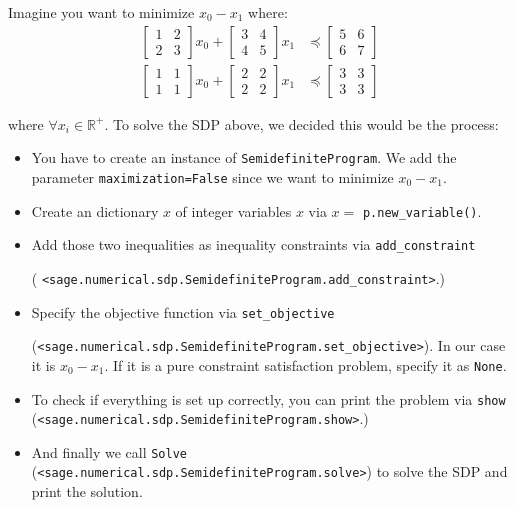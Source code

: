 Imagine you want to minimize $x_0 - x_1$ where:
\begin{align}
\left[\begin{matrix} 1 & 2  \\ 2 & 3  \end{matrix}\right]  x_0 +  \left[\begin{matrix} 3 & 4  \\ 4 & 5  \end{matrix}\right]  x_1 &\preceq   \left[\begin{matrix} 5 & 6  \\ 6 & 7  \end{matrix}\right] \\ 
\left[\begin{matrix} 1 & 1  \\ 1 & 1  \end{matrix}\right]  x_0 +  \left[ \begin{matrix} 2 & 2  \\ 2 & 2  \end{matrix}\right]  x_1 &\preceq   \left[\begin{matrix} 3 & 3  \\ 3 & 3  \end{matrix}\right] 
\end{align}


where $\forall x_i \in \mathbb{R}^+$.  To solve the SDP above, we decided this would be the process:

\begin{itemize}
  \item You have to create an instance of \texttt{SemidefiniteProgram}. We
     add the parameter \texttt{maximization=False} since we want to minimize $x_0 - x_1$.

  \item Create an dictionary $x$ of integer variables $x$ via $x =$
  \texttt{p.new\_variable()}.
  \item Add those two inequalities as inequality constraints via
     \texttt{add\_constraint} 
     
     ( \texttt{<sage.numerical.sdp.SemidefiniteProgram.add\_constraint>}.)

  \item Specify the objective function via \texttt{set\_objective}
  
   (\texttt{<sage.numerical.sdp.SemidefiniteProgram.set\_objective>}).
     In our case it is  $x_0 - x_1$. If it
     is a pure constraint satisfaction problem, specify it as \texttt{None}.

  \item To check if everything is set up correctly, you can print the problem via
     \texttt{show} (\texttt{<sage.numerical.sdp.SemidefiniteProgram.show>}.)

  \item And finally we call \texttt{Solve} (\texttt{<sage.numerical.sdp.SemidefiniteProgram.solve>}) to solve the SDP and print the
  solution.
\end{itemize}


